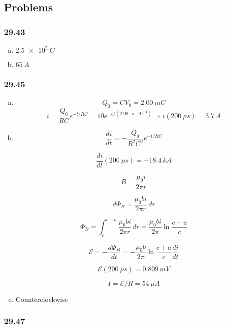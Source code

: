 \documentclass{article}
\begin{document}
\subsection{Problems}

\subsubsection{29.43}

\begin{enumerate}[(a)]
  \item $\qty{2.5e5}{C}$

  \item $\qty{65}{A}$
\end{enumerate}

\subsubsection{29.45}

\begin{enumerate}[(a)]
  \item \[Q_0 = C V_0 = \qty{2.00}{mC}\] \[i = \frac{Q_0}{R C} e^{-t / RC} = 10 e^{-t / (\num{2.00e-4})} \Rightarrow i(\qty{200}{\mu s}) = \qty{3.7}{A}\]

  \item

        \[\frac{di}{dt} = -\frac{Q_0}{R^2 C^2} e^{-t / R C}\]

        \[\frac{di}{dt}(\qty{200}{\mu s}) = \qty{-18.4}{kA}\]

        \[B = \frac{\mu_0 i}{2 \pi r}\]

        \[d \Phi_B = \frac{\mu_0 b i}{2 \pi r} \,dr\]

        \[\Phi_B = \int_c^{c + a} \frac{\mu_0 b i}{2 \pi r} \,dr = \frac{\mu_0 b i}{2 \pi} \ln \frac{c + a}{c}\]

        \[\mathcal{E} = -\frac{d \Phi_B}{dt} = -\frac{\mu_0 b}{2 \pi} \ln \frac{c + a}{c} \frac{di}{dt}\]

        \[\mathcal{E}(\qty{200}{\mu s}) = \qty{0.809}{mV}\]

        \[I = \mathcal{E} / R = \qty{54}{\mu A}\]

  \item Counterclockwise
\end{enumerate}

\subsubsection{29.47}
\end{document}
